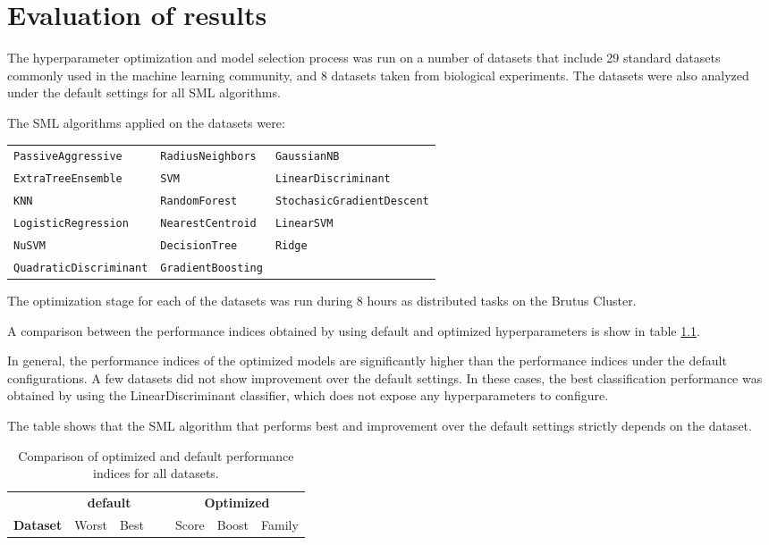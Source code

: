 \chapter{Evaluation of results}


The hyperparameter optimization and model selection process was run on a number of datasets that
include 29 standard datasets commonly used in the machine learning community, and 8 datasets taken from
biological experiments. The datasets were also analyzed under the default settings for all SML
algorithms.

The SML algorithms applied on the datasets were:

\begin{tabularx}{\textwidth}{l l l}
\texttt{PassiveAggressive} &
\texttt{RadiusNeighbors} &
\texttt{GaussianNB} \\
\texttt{ExtraTreeEnsemble} &
\texttt{SVM} &
\texttt{LinearDiscriminant} \\
\texttt{KNN} &
\texttt{RandomForest} &
\texttt{StochasicGradientDescent} \\
\texttt{LogisticRegression} &
\texttt{NearestCentroid} & 
\texttt{LinearSVM}\\
\texttt{NuSVM} &
\texttt{DecisionTree} &
\texttt{Ridge} \\
\texttt{QuadraticDiscriminant} &
\texttt{GradientBoosting} &
\end{tabularx}


The optimization stage for each of the datasets was run during 8 hours as distributed tasks on the
Brutus Cluster.

A comparison between the performance indices obtained by using default and optimized hyperparameters
is show in table \ref{tb:comparison_all}.

In general, the performance indices of the optimized models are significantly higher than the
performance indices under the default configurations. A few datasets did not show improvement over
the default settings. In these cases, the best classification performance was obtained by using the
LinearDiscriminant classifier, which does not expose any hyperparameters to configure.

The table shows that the SML algorithm that performs best and improvement over the default settings
strictly depends on the dataset.

\begin{table}[h!]
\centering
\begin{tabularx}{\textwidth}{l r r r r r l}
	& \multicolumn{2}{c}{\bf default} & ~ & \multicolumn{3}{c}{\bf Optimized}\\
	\cline{2-3}
	\cline{5-7}
{\bf Dataset} & Worst & Best & ~ & Score & Boost & Family\\
	\cline{1-7}
	
\end{tabularx}
\caption{Comparison of optimized and default performance indices for all datasets.}
\label{tb:comparison_all}
\end{table}


